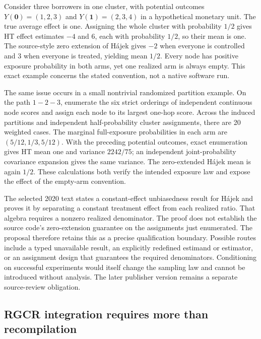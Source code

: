 Consider three borrowers in one cluster, with potential outcomes $Y(\mathbf0)=(1,2,3)$ and $Y(\mathbf1)=(2,3,4)$ in a hypothetical monetary unit. The true average effect is one. Assigning the whole cluster with probability $1/2$ gives HT effect estimates $-4$ and $6$, each with probability $1/2$, so their mean is one. The source-style zero extension of H\'ajek gives $-2$ when everyone is controlled and $3$ when everyone is treated, yielding mean $1/2$. Every node has positive exposure probability in both arms, yet one realized arm is always empty. This exact example concerns the stated convention, not a native software run.~\citep{exec25_cnet_choice}

The same issue occurs in a small nontrivial randomized partition example. On the path $1-2-3$, enumerate the six strict orderings of independent continuous node scores and assign each node to its largest one-hop score. Across the induced partitions and independent half-probability cluster assignments, there are 20 weighted cases. The marginal full-exposure probabilities in each arm are $(5/12,1/3,5/12)$. With the preceding potential outcomes, exact enumeration gives HT mean one and variance $2242/75$; an independent joint-probability covariance expansion gives the same variance. The zero-extended H\'ajek mean is again $1/2$. These calculations both verify the intended exposure law and expose the effect of the empty-arm convention.~\citep{exec25_cnet_choice}

The selected 2020 text states a constant-effect unbiasedness result for H\'ajek and proves it by separating a constant treatment effect from each realized ratio. That algebra requires a nonzero realized denominator. The proof does not establish the source code's zero-extension guarantee on the assignments just enumerated. The proposal therefore retains this as a precise qualification boundary. Possible routes include a typed unavailable result, an explicitly redefined estimand or estimator, or an assignment design that guarantees the required denominators. Conditioning on successful experiments would itself change the sampling law and cannot be introduced without analysis. The later publisher version remains a separate source-review obligation.~\citep{exec25_cnet_paper,exec25_cnet_choice}

\subsection{RGCR integration requires more than recompilation}

